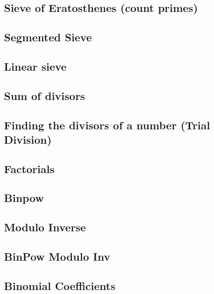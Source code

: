 \documentclass[10pt]{article}
\begin{document}
\begin{multicols*}{2}
\subsection{Sieve of Eratosthenes (count primes)}

\subsection{Segmented Sieve}

\subsection{Linear sieve}


\subsection{Sum of divisors}


\subsection{Finding the divisors of a number (Trial Division)}


\subsection{Factorials}


\subsection{Binpow}

\subsection{Modulo Inverse}


\subsection{BinPow Modulo Inv}

\subsection{Binomial Coefficients}


\end{multicols*}
\end{document}
